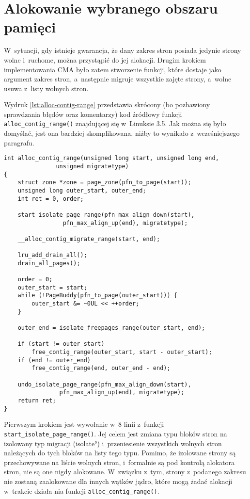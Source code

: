\section{Alokowanie wybranego obszaru pamięci}\label{sec:alloc-contig-range}

W~sytuacji, gdy istnieje gwarancja, że dany zakres stron posiada
jedynie strony wolne i~ruchome, można przystąpić do jej alokacji.
Drugim krokiem implementowania CMA było zatem stworzenie funkcji,
które dostaje jako argument zakres stron, a~następnie migruje
wszystkie zajęte strony, a~wolne usuwa z~listy wolnych stron.

Wydruk \ref{lst:alloc-contig-range} przedstawia skrócony (bo
pozbawiony sprawdzania błędów oraz komentarzy) kod źródłowy funkcji
\lstinline|alloc_contig_range()| znajdującej się w~Linuksie 3.5.  Jak
można się było domyślać, jest ona bardziej skomplikowana, niżby to
wynikało z~wcześniejszego paragrafu.

\begin{lstlisting}[float=tbhp,caption=Skrócony wydruk funkcji
    \lstinline|alloc_conting_range()| z Linuksa 3.5.,label=lst:alloc-contig-range]
int alloc_contig_range(unsigned long start, unsigned long end,
		       unsigned migratetype)
{
	struct zone *zone = page_zone(pfn_to_page(start));
	unsigned long outer_start, outer_end;
	int ret = 0, order;

	start_isolate_page_range(pfn_max_align_down(start),
				 pfn_max_align_up(end), migratetype);

	__alloc_contig_migrate_range(start, end);

	lru_add_drain_all();
	drain_all_pages();

	order = 0;
	outer_start = start;
	while (!PageBuddy(pfn_to_page(outer_start))) {
		outer_start &= ~0UL << ++order;
	}

	outer_end = isolate_freepages_range(outer_start, end);

	if (start != outer_start)
		free_contig_range(outer_start, start - outer_start);
	if (end != outer_end)
		free_contig_range(end, outer_end - end);

	undo_isolate_page_range(pfn_max_align_down(start),
				pfn_max_align_up(end), migratetype);
	return ret;
}
\end{lstlisting}

Pierwszym krokiem jest wywołanie w~8 linii z~funkcji
\lstinline|start_isolate_page_range()|.  Jej celem jest zmiana typu
bloków stron na izolowany typ migracji (\ang{isolate}) i~przeniesienie
wszystkich wolnych stron należących do tych bloków na listy tego typu.
Pomimo, że izolowane strony są przechowywane na liście wolnych stron,
i~formalnie są pod kontrolą alokatora stron, nie są one nigdy
alokowane.  W~związku z~tym, strony z~podanego zakresu nie zostaną
zaalokowane dla innych wątków jądro, które mogą żadać alokacji
w~trakcie działa nia funkcji \lstinline|alloc_contig_range()|.

